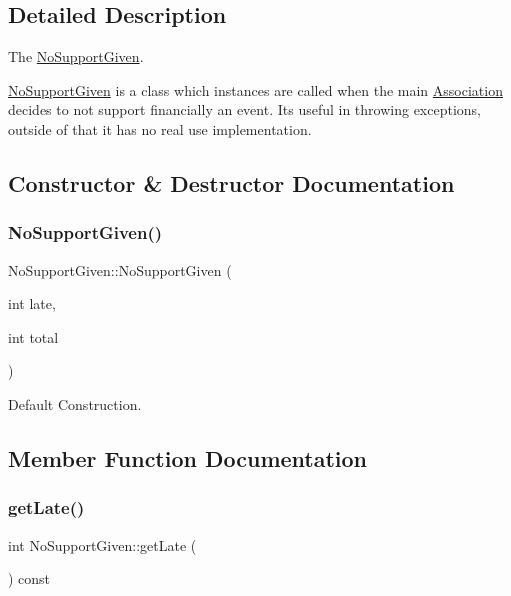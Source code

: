 \subsection{Detailed Description}
The \hyperlink{classNoSupportGiven}{No\+Support\+Given}. 

\hyperlink{classNoSupportGiven}{No\+Support\+Given} is a class which instances are called when the main \hyperlink{classAssociation}{Association} decides to not support financially an event. Its useful in throwing exceptions, outside of that it has no real use implementation. 

\subsection{Constructor \& Destructor Documentation}
\mbox{\label{classNoSupportGiven_a85c20af147aefa12cfa30903d6b6b499}} 
\subsubsection{\texorpdfstring{No\+Support\+Given()}{NoSupportGiven()}}
{\footnotesize\ttfamily No\+Support\+Given\+::\+No\+Support\+Given (\begin{DoxyParamCaption}\item[{int}]{late,  }\item[{int}]{total }\end{DoxyParamCaption})\hspace{0.3cm}{\ttfamily [inline]}}



Default Construction. 



\subsection{Member Function Documentation}
\mbox{\label{classNoSupportGiven_a44a7843aed1c26053e622cd3666080e0}} 
\subsubsection{\texorpdfstring{get\+Late()}{getLate()}}
{\footnotesize\ttfamily int No\+Support\+Given\+::get\+Late (\begin{DoxyParamCaption}{ }\end{DoxyParamCaption}) const\hspace{0.3cm}{\ttfamily [inline]}}



